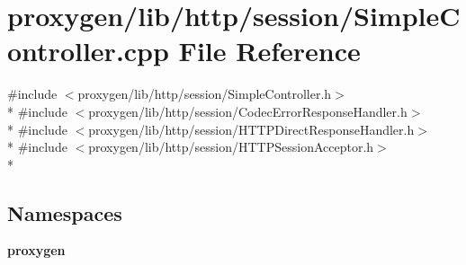 \section{proxygen/lib/http/session/\+Simple\+Controller.cpp File Reference}
\label{SimpleController_8cpp}
{\ttfamily \#include $<$proxygen/lib/http/session/\+Simple\+Controller.\+h$>$}\\*
{\ttfamily \#include $<$proxygen/lib/http/session/\+Codec\+Error\+Response\+Handler.\+h$>$}\\*
{\ttfamily \#include $<$proxygen/lib/http/session/\+H\+T\+T\+P\+Direct\+Response\+Handler.\+h$>$}\\*
{\ttfamily \#include $<$proxygen/lib/http/session/\+H\+T\+T\+P\+Session\+Acceptor.\+h$>$}\\*
\subsection*{Namespaces}
\begin{DoxyCompactItemize}
\item 
 {\bf proxygen}
\end{DoxyCompactItemize}
